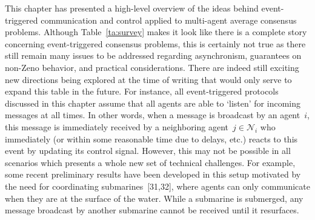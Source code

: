 \documentclass[]{book}
\newcommand{\NN}{{\mathcal{N}}}
\begin{document}
This chapter has presented a high-level overview of the ideas behind
event-triggered communication and control applied to multi-agent
average consensus problems.  Although Table~\ref{ta:survey} makes it
look like there is a complete story concerning event-triggered
consensus problems, this is certainly not true as there still remain
many issues to be addressed regarding asynchronism, guarantees on
non-Zeno behavior, and practical considerations. There are indeed
still exciting new directions being explored at the time of writing
that would only serve to expand this table in the future.  For
instance, all event-triggered protocols discussed in this chapter
assume that all agents are able to `listen' for incoming messages at
all times. In other words, when a message is broadcast by an
agent~$i$, this message is immediately received by a neighboring
agent~$j \in \NN_i$ who immediately (or within some reasonable time
due to delays, etc.) reacts to this event by updating its control
signal.  However, this may not be possible in all scenarios which
presents a whole new set of technical challenges. For example, some
recent preliminary results have been developed in this setup motivated
by the need for coordinating
submarines~[31,32], where agents can only
communicate when they are at the surface of the water. While a
submarine is submerged, any message broadcast by another submarine
cannot be received until it resurfaces.

%
\end{document}
